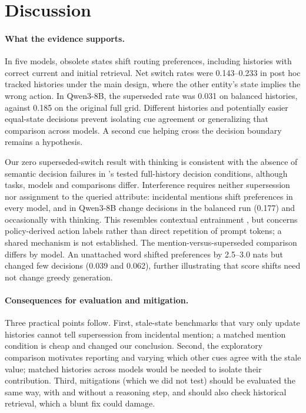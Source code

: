 \section{Discussion}
\label{sec:discussion}

\paragraph{What the evidence supports.} In five models, obsolete states shift routing preferences,
including histories with correct current and initial retrieval. Net switch rates were 0.143--0.233 in
post hoc tracked histories under the main design, where the other entity's state implies the wrong
action. In Qwen3-8B, the superseded rate was 0.031 on balanced histories, against 0.185 on the original
full grid. Different histories and potentially easier equal-state decisions prevent isolating cue
agreement or generalizing that comparison across models. A second cue helping cross the decision
boundary remains a hypothesis.

Our zero superseded-switch result with thinking is consistent with the absence of semantic decision
failures in \citet{guo2026context}'s tested full-history decision conditions, although tasks, models and
comparisons differ. Interference requires neither supersession nor assignment to the queried attribute:
incidental mentions shift preferences in every model, and in Qwen3-8B change decisions in the balanced
run (0.177) and occasionally with thinking. This resembles contextual entrainment
\citep{niu2025entrainment}, but concerns policy-derived action labels rather than direct repetition of
prompt tokens; a shared mechanism is not established. The mention-versus-superseded comparison differs
by model. An unattached word shifted preferences by 2.5--3.0 nats but changed few decisions (0.039 and
0.062), further illustrating that score shifts need not change greedy generation.

\paragraph{Consequences for evaluation and mitigation.} Three practical points follow. First, stale-state
benchmarks that vary only update histories cannot tell supersession from incidental mention; a matched
mention condition is cheap and changed our conclusion. Second, the exploratory comparison motivates reporting and varying which other cues agree with the
stale value; matched histories across models would be needed to isolate their contribution. Third,
mitigations (which we did not test) should be evaluated the same way, with and without a reasoning step,
and should also check historical retrieval, which a blunt fix could damage.

